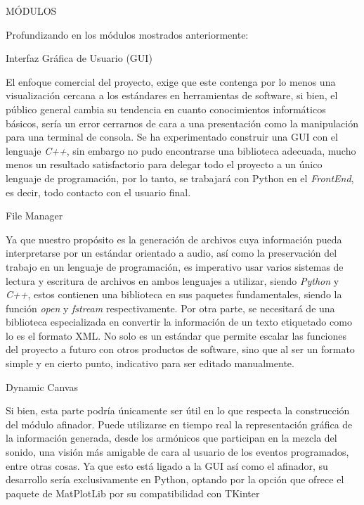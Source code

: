 \documentclass{book}
\begin{document}
	\pagebreak
	\begin{minipage}{.7\textwidth}
		\begin{flushleft}
			\vspace{10pt}
			\begin{center}
				\Large{MÓDULOS}
				\hrulefill\\[1.5cm]
			\end{center}
		\end{flushleft}
	\end{minipage}\par
	Profundizando en los módulos mostrados anteriormente:\par
	{\large Interfaz Gráfica de Usuario (GUI)}\par
	El enfoque comercial del proyecto, exige que este contenga por lo menos una visualización cercana a los estándares en herramientas de software, si bien, el público general cambia su tendencia en cuanto conocimientos informáticos básicos, sería un error cerrarnos de cara a una presentación como la manipulación para una terminal de consola. Se ha experimentado construir una GUI con el lenguaje \emph{C++}, sin embargo no pudo encontrarse una biblioteca adecuada, mucho menos un resultado satisfactorio para delegar todo el proyecto a un único lenguaje de programación, por lo tanto, se trabajará con Python en el \emph{FrontEnd}, es decir, todo contacto con el usuario final.\par
	{\normalsize File Manager}\par
	Ya que nuestro propósito es la generación de archivos cuya información pueda interpretarse por un estándar orientado a audio, así como la preservación del trabajo en un lenguaje de programación, es imperativo usar varios sistemas de lectura y escritura de archivos en ambos lenguajes a utilizar, siendo \emph{Python} y \emph{C++}, estos contienen una biblioteca en sus paquetes fundamentales, siendo la función \emph{open} y \emph{fstream} respectivamente. Por otra parte, se necesitará de una biblioteca especializada en convertir la información de un texto etiquetado como lo es el formato XML. No solo es un estándar que permite escalar las funciones del proyecto a futuro con otros productos de software, sino que al ser un formato simple y en cierto punto, indicativo para ser editado manualmente.\par
	{\normalsize Dynamic Canvas}\par
	Si bien, esta parte podría únicamente ser útil en lo que respecta la construcción del módulo afinador. Puede utilizarse en tiempo real la representación gráfica de la información generada, desde los armónicos que participan en la mezcla del sonido, una visión más amigable de cara al usuario de los eventos programados, entre otras cosas. Ya que esto está ligado a la GUI así como el afinador, su desarrollo sería exclusivamente en Python, optando por la opción que ofrece el paquete de MatPlotLib por su compatibilidad con TKinter\par
\end{document}
